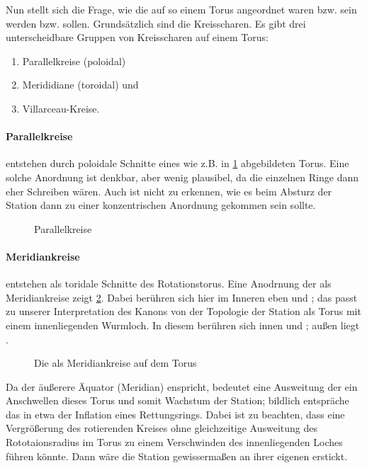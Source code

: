 Nun stellt sich die Frage, wie die  auf so einem Torus angeordnet waren bzw. sein werden bzw. sollen. 
Grundsätzlich sind die  Kreisscharen. Es gibt drei unterscheidbare Gruppen von Kreisscharen auf einem Torus: 
\begin{enumerate}
    \item Parallelkreise (poloidal)
    \item Merididiane (toroidal) und 
    \item Villarceau-Kreise.
\end{enumerate}


\paragraph{Parallelkreise} entstehen durch poloidale Schnitte eines wie z.B. in \cref{fig:torus-parallele} abgebildeten Torus. Eine solche Anordnung ist denkbar, aber wenig plausibel, da die einzelnen Ringe dann eher Schreiben wären. Auch ist nicht zu erkennen, wie es beim Absturz der Station dann zu einer konzentrischen Anordnung gekommen sein sollte. 

\begin{figure}[ht!]
    \centering
    
    \caption{Parallelkreise}
    \label{fig:torus-parallele}
\end{figure}

\paragraph{Meridiankreise} entstehen als toridale Schnitte des Rotationstorus. 
Eine Anodrnung der  als Meridiankreise  zeigt \cref{fig:torus-meridiane}.  
Dabei berühren sich hier im Inneren eben  und ; das passt zu unserer Interpretation des Kanons von der Topologie der Station als Torus mit einem innenliegenden Wurmloch. In diesem berühren sich innen  und ; außen liegt . 

\begin{figure}[ht!]
    \centering
        
    \caption{Die  als Meridiankreise auf dem Torus}
    \label{fig:torus-meridiane}
\end{figure}


Da der äußerere Äquator (Meridian)  enspricht, bedeutet eine Ausweitung der  ein Anschwellen dieses Torus und somit Wachstum der Station; bildlich entspräche das in etwa der Inflation eines Rettungsrings. Dabei ist zu beachten, dass eine Vergrößerung des rotierenden Kreises ohne gleichzeitige Ausweitung des Rototaionsradius im Torus zu einem Verschwinden des innenliegenden Loches führen könnte. Dann wäre die Station gewissermaßen an ihrer eigenen  erstickt.

